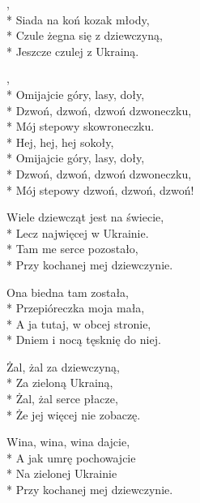 \begin{lyrics}[longestline={Hej, tam gdzieś znad czarnej wody,}]

,\\*
Siada na koń kozak młody,\\*
Czule żegna się z dziewczyną,\\*
Jeszcze czulej z Ukrainą.

\begin{chorus}
,\\*
Omijajcie góry, lasy, doły,\\*
Dzwoń, dzwoń, dzwoń dzwoneczku,\\*
Mój stepowy skowroneczku.\\*
\smallskip
Hej, hej, hej sokoły,\\*
Omijajcie góry, lasy, doły,\\*
Dzwoń, dzwoń, dzwoń dzwoneczku,\\*
Mój stepowy dzwoń, dzwoń, dzwoń!
\end{chorus}

Wiele dziewcząt jest na świecie,\\*
Lecz najwięcej w Ukrainie.\\*
Tam me serce pozostało,\\*
Przy kochanej mej dziewczynie.

\chorusref

Ona biedna tam została,\\*
Przepióreczka moja mała,\\*
A ja tutaj, w obcej stronie,\\*
Dniem i nocą tęsknię do niej.

\chorusref

Żal, żal za dziewczyną,\\*
Za zieloną Ukrainą,\\*
Żal, żal serce płacze,\\*
Że jej więcej nie zobaczę.

\chorusref

Wina, wina, wina dajcie,\\*
A jak umrę pochowajcie\\*
Na zielonej Ukrainie\\*
Przy kochanej mej dziewczynie.
\end{lyrics}





